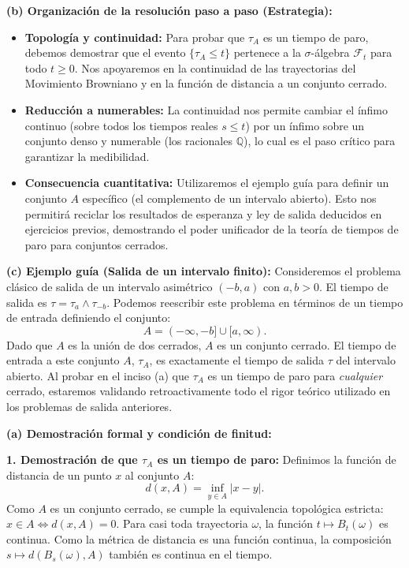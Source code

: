 \documentclass[11pt, letterpaper]{article}
\begin{document}
\begin{solucion}
    \textbf{(b) Organización de la resolución paso a paso (Estrategia):}
    \begin{itemize}
        \item[(i)] \textbf{Topología y continuidad:} Para probar que $\tau_A$ es un tiempo de paro, debemos demostrar que el evento $\{\tau_A \le t\}$ pertenece a la $\sigma$-álgebra $\mathcal{F}_t$ para todo $t \ge 0$. Nos apoyaremos en la continuidad de las trayectorias del Movimiento Browniano y en la función de distancia a un conjunto cerrado.
        \item[(ii)] \textbf{Reducción a numerables:} La continuidad nos permite cambiar el ínfimo continuo (sobre todos los tiempos reales $s \le t$) por un ínfimo sobre un conjunto denso y numerable (los racionales $\mathbb{Q}$), lo cual es el paso crítico para garantizar la medibilidad.
        \item[(iii)] \textbf{Consecuencia cuantitativa:} Utilizaremos el ejemplo guía para definir un conjunto $A$ específico (el complemento de un intervalo abierto). Esto nos permitirá reciclar los resultados de esperanza y ley de salida deducidos en ejercicios previos, demostrando el poder unificador de la teoría de tiempos de paro para conjuntos cerrados.
    \end{itemize}

    \vspace{3mm}
    \textbf{(c) Ejemplo guía (Salida de un intervalo finito):}
    Consideremos el problema clásico de salida de un intervalo asimétrico $(-b, a)$ con $a, b > 0$. 
    El tiempo de salida es $\tau = \tau_a \wedge \tau_{-b}$.
    Podemos reescribir este problema en términos de un tiempo de entrada definiendo el conjunto:
    \[ A = (-\infty, -b] \cup [a, \infty). \]
    Dado que $A$ es la unión de dos cerrados, $A$ es un conjunto cerrado. El tiempo de entrada a este conjunto $A$, $\tau_A$, es exactamente el tiempo de salida $\tau$ del intervalo abierto. Al probar en el inciso (a) que $\tau_A$ es un tiempo de paro para \textit{cualquier} cerrado, estaremos validando retroactivamente todo el rigor teórico utilizado en los problemas de salida anteriores.

    \vspace{3mm}
    \textbf{(a) Demostración formal y condición de finitud:}

    \textbf{1. Demostración de que $\tau_A$ es un tiempo de paro:}
    Definimos la función de distancia de un punto $x$ al conjunto $A$:
    \[ d(x, A) = \inf_{y \in A} |x - y|. \]
    Como $A$ es un conjunto cerrado, se cumple la equivalencia topológica estricta: $x \in A \iff d(x, A) = 0$.
    Para casi toda trayectoria $\omega$, la función $t \mapsto B_t(\omega)$ es continua. Como la métrica de distancia es una función continua, la composición $s \mapsto d(B_s(\omega), A)$ también es continua en el tiempo.
    

\end{solucion}
\end{document}
